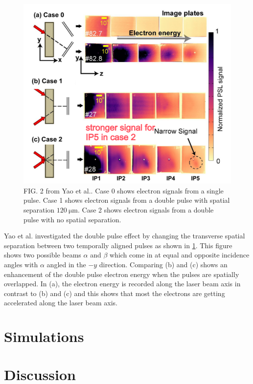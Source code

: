 \begin{figure}
	\centering 
	\includegraphics[width=\linewidth]{planning/images/yao_exp_stacks.PNG}
	\caption{FIG. 2 from Yao et al.\cite{Yao_2024_MaRaE}. Case 0 shows electron signals from a single pulse. Case 1 shows electron signals from a double pulse with spatial separation $\SI{120}{\micro \meter}$. Case 2 shows electron signals from a double pulse with no spatial separation.}
	\label{fig:yao_exp_stacks}
\end{figure}

Yao et al.\cite{Yao_2024_MaRaE} investigated the double pulse effect by changing the transverse spatial separation between two temporally aligned pulses as shown in \cref{fig:yao_exp_stacks}. This figure shows two possible beams $\alpha$ and $\beta$ which come in at equal and opposite incidence angles with $\alpha$ angled in the $-y$ direction. Comparing (b) and (c) shows an enhancement of the double pulse electron energy when the pulses are spatially overlapped. In (a), the electron energy is recorded along the laser beam axis in contrast to (b) and (c) and this shows that most the electrons are getting accelerated along the laser beam axis. 

\section{Simulations}

\section{Discussion}

